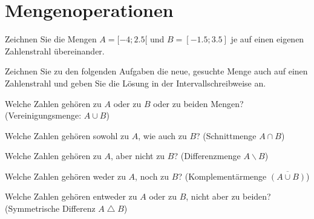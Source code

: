 \platzFuerBerechnungenBisEndeSeite{}




\section{Mengenoperationen}
Zeichnen Sie die Mengen $A = [-4 ; 2.5[$ und $B = [-1.5; 3.5]$
je auf einen eigenen Zahlenstrahl übereinander.

Zeichnen Sie zu den folgenden Aufgaben die neue, gesuchte Menge auch auf
einen Zahlenstrahl und geben Sie die Lösung in der Intervallschreibweise an.


\begin{bbwAufgabenBlock}
\item Welche Zahlen gehören zu $A$ oder zu $B$ oder zu beiden Mengen?
(Vereinigungsmenge: $A\cup B$) \LoesungsRaumLang{$[-4;3.5]$}

\item Welche Zahlen gehören sowohl zu $A$, wie auch zu $B$?
(Schnittmenge $A\cap B$) \LoesungsRaumLang{$[-1.5; 2.5[$}

\item Welche Zahlen gehören zu $A$, aber nicht zu $B$?
(Differenzmenge $A\backslash B$) \LoesungsRaumLang{$[-4;-1.5[$}

\item Welche Zahlen gehören weder zu $A$, noch zu
$B$? (Komplementärmenge $\overline{(A\cup B)}$) \LoesungsRaumLang{$]-\infty; -4[ \cup ]3.5;\infty[$}

\item Welche Zahlen gehören entweder zu $A$ oder zu $B$, nicht aber zu
beiden? (Symmetrische Differenz $A\bigtriangleup B$) \LoesungsRaumLang{$[-4;-1.5[ \cup [2.5;3.5]$}

\end{bbwAufgabenBlock}


\platzFuerBerechnungenBisEndeSeite{}



